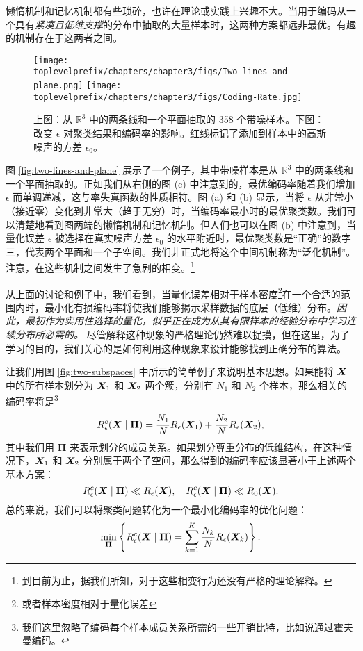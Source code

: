 \documentclass[../../book-main.tex]{subfiles}
\begin{document}
懒惰机制和记忆机制都有些琐碎，也许在理论或实践上兴趣不大。当用于编码从一个具有{\em 紧凑且低维支撑}的分布中抽取的大量样本时，这两种方案都远非最优。有趣的机制存在于这两者之间。
\begin{example}
	\begin{figure}[t]
		\centering
		\texttt{[image: \\toplevelprefix/chapters/chapter3/figs/Two-lines-and-plane.png]}
		\texttt{[image: \\toplevelprefix/chapters/chapter3/figs/Coding-Rate.jpg]}
		\caption{上图：从 $\mathbb{R}^3$ 中的两条线和一个平面抽取的 358 个带噪样本。下图：改变 $\epsilon$ 对聚类结果和编码率的影响。红线标记了添加到样本中的高斯噪声的方差 $\epsilon_0$。}
		\label{fig:two-lines-and-plane}
		\label{fig:two-lines-and-plane-epsilon}
	\end{figure}
	图 \ref{fig:two-lines-and-plane} 展示了一个例子，其中带噪样本是从 $\mathbb{R}^3$ 中的两条线和一个平面抽取的。正如我们从右侧的图 (c) 中注意到的，最优编码率随着我们增加 $\epsilon$ 而单调递减，这与率失真函数的性质相符。图 (a) 和 (b) 显示，当将 $\epsilon$ 从非常小（接近零）变化到非常大（趋于无穷）时，当编码率最小时的最优聚类数。我们可以清楚地看到图两端的懒惰机制和记忆机制。但人们也可以在图 (b) 中注意到，当量化误差 $\epsilon$ 被选择在真实噪声方差 $\epsilon_0$ 的水平附近时，最优聚类数是“正确”的数字三，代表两个平面和一个子空间。我们非正式地将这个中间机制称为“泛化机制”。注意，在这些机制之间发生了急剧的相变。\footnote{到目前为止，据我们所知，对于这些相变行为还没有严格的理论解释。}
\end{example}


从上面的讨论和例子中，我们看到，当量化误差相对于样本密度\footnote{或者样本密度相对于量化误差}在一个合适的范围内时，最小化有损编码率将使我们能够揭示采样数据的底层（低维）分布。{\em 因此，最初作为实用性选择的量化，似乎正在成为从其有限样本的经验分布中学习连续分布所必需的。} 尽管解释这种现象的严格理论仍然难以捉摸，但在这里，为了学习的目的，我们关心的是如何利用这种现象来设计能够找到正确分布的算法。

让我们用图 \ref{fig:two-subspaces} 中所示的简单例子来说明基本思想。如果能将 $\bm{X}$ 中的所有样本划分为 $\bm{X}_1$ 和 $\bm{X}_2$ 两个簇，分别有 $N_1$ 和 $N_2$ 个样本，那么相关的编码率将是\footnote{我们这里忽略了编码每个样本成员关系所需的一些开销比特，比如说通过霍夫曼编码。}
\begin{equation}
	R_{\epsilon}^c(\bm{X}\mid \boldsymbol{\Pi}) = \frac{N_1}{N}R_{\epsilon}(\bm{X}_1) + \frac{N_2}{N}R_{\epsilon}(\bm{X}_2),
\end{equation}
其中我们用 $\boldsymbol{\Pi}$ 来表示划分的成员关系。如果划分尊重分布的低维结构，在这种情况下，$\bm{X}_1$ 和 $\bm{X}_2$ 分别属于两个子空间，那么得到的编码率应该显著小于上述两个基本方案：
\begin{equation}
	R_{\epsilon}^c(\bm{X} \mid \boldsymbol{\Pi}) \ll R_{\epsilon}(\bm{X}), \quad     R_{\epsilon}^c(\bm{X} \mid \boldsymbol{\Pi}) \ll R_0(\bm{X}).
\end{equation}
总的来说，我们可以将聚类问题转化为一个最小化编码率的优化问题：
\begin{equation}
	\min_{\boldsymbol{\Pi}}  \left\{ R_{\epsilon}^c(\bm{X} \mid \boldsymbol{\Pi}) = \sum_{k=1}^K \frac{N_k}{N}R_{\epsilon}(\bm{X}_k)\right\}.
\end{equation}
\end{document}
